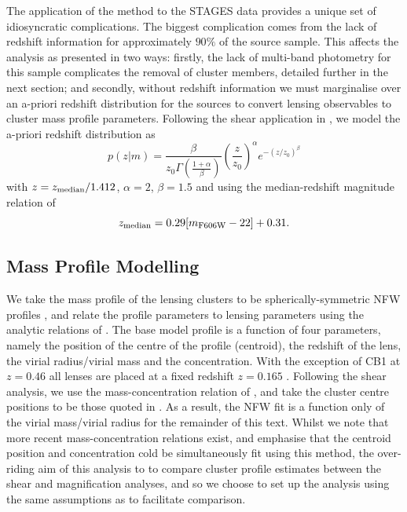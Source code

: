 \documentclass[useAMS,usenatbib,times,letter,amssymb]{mn2e}
\def\be{\begin{equation}}
\def\ee{\end{equation}}
\begin{document}
The application of the method to the STAGES data provides a unique set of idiosyncratic complications. The biggest complication comes from the lack of redshift information for approximately $90\%$ of the source sample. This affects the analysis as presented in two ways: firstly, the lack of multi-band photometry for this sample complicates the removal of cluster members, detailed further in the next section; and secondly, without redshift information we must marginalise over an a-priori redshift distribution for the sources to convert lensing observables to cluster mass profile parameters. Following the shear application in \cite{Heymans:2008p2060}, we model the a-priori redshift distribution as 
\be\label{eqn:RedshiftDist}
p(z|m) = \frac{\beta}{z_0\Gamma \left( \frac{1+\alpha}{\beta} \right)}\left(\frac{z}{z_0}\right)^\alpha e^{-(z/z_0)^\beta}
\ee
with $z = z_{\rm median}/1.412$, $\alpha = 2$, $\beta = 1.5$ and using the median-redshift magnitude relation of \cite{Schrabback:2007p2802}
\be\label{eqn:zmed_mag}
z_{\rm median} = 0.29[m_{\rm F606W} - 22] + 0.31.
\ee

\subsection{Mass Profile Modelling}


We take the mass profile of the lensing clusters to be spherically-symmetric NFW profiles \citep{Navarro:1997p2675}, and relate the profile parameters to lensing parameters using the analytic relations of \cite{Wright:2000p2260}. The base model profile is a function of four parameters, namely the position of the centre of the profile (centroid), the redshift of the lens, the virial radius/virial mass and the concentration. With the exception of CB1 at $z = 0.46$ \citep{Taylor:2004p2808} all lenses are placed at a fixed redshift $z = 0.165$ \citep{Gray:2009p2720}. Following the shear analysis, we use the mass-concentration relation of \cite{Dolag:2004p2721}, and take the cluster centre positions to be those quoted in \cite{Heymans:2008p2060}. As a result, the NFW fit is a function only of the virial mass/virial radius for the remainder of this text. Whilst we note that more recent mass-concentration relations exist, and emphasise that the centroid position and concentration cold be simultaneously fit using this method, the over-riding aim of this analysis to to compare cluster profile estimates between the shear and magnification analyses, and so we choose to set up the analysis using the same assumptions as \cite{Heymans:2008p2060} to facilitate comparison.
\end{document}
